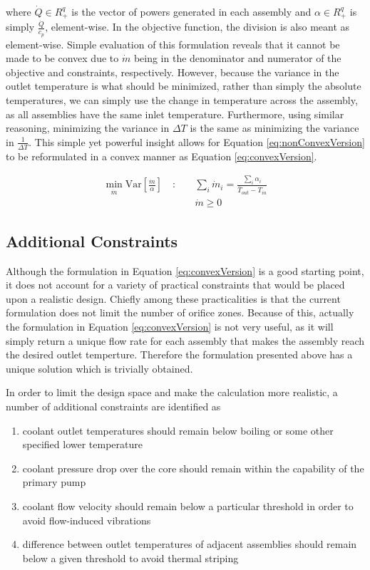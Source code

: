 \documentclass[11pt, oneside]{article}   	%
\newcommand{\Var}{\mathrm{Var}}
\begin{document}
where $\dot{Q} \in R^q_+$ is the vector of powers generated in each assembly and $\alpha \in R^q_+$ is simply $\frac{\dot{Q}}{c_p}$, element-wise.
In the objective function, the division is also meant as element-wise.
Simple evaluation of this formulation reveals that it cannot be made to be convex due to $\dot{m}$ being in the denominator and numerator of the objective and constraints, respectively.
However, because the variance in the outlet temperature is what should be minimized, rather than simply the absolute temperatures, we can simply use the change in temperature across the assembly, as all assemblies have the same inlet temperature.
Furthermore, using similar reasoning, minimizing the variance in $\Delta T$ is the same as minimizing the variance in $\frac{1}{\Delta T}$.
This simple yet powerful insight allows for Equation \ref{eq:nonConvexVersion} to be reformulated in a convex manner as Equation \ref{eq:convexVersion}.

\begin{align}
\min_{\dot{m}} \Var [\frac{\dot{m}}{\alpha}] \quad : \quad & \sum_i \dot{m}_i = \frac{\sum_i \alpha_i}{\bar{T}_{out}-T_{in}} \label{eq:convexVersion} \\
& \dot{m} \geq 0 \nonumber
\end{align}

\subsection{Additional Constraints}

Although the formulation in Equation \ref{eq:convexVersion} is a good starting point, it does not account for a variety of practical constraints that would be placed upon a realistic design.
Chiefly among these practicalities is that the current formulation does not limit the number of orifice zones.
Because of this, actually the formulation in Equation \ref{eq:convexVersion} is not very useful, as it will simply return a unique flow rate for each assembly that makes the assembly reach the desired outlet temperture.
Therefore the formulation presented above has a unique solution which is trivially obtained. 

In order to limit the design space and make the calculation more realistic, a number of additional constraints are identified as

\begin{enumerate}
\item \label{list:maxTemp}coolant outlet temperatures should remain below boiling or some other specified lower temperature 
\item \label{list:dP} coolant pressure drop over the core should remain within the capability of the primary pump
\item \label{list:v_max} coolant flow velocity should remain below a particular threshold in order to avoid flow-induced vibrations
\item \label{list:adjacent} difference between outlet temperatures of adjacent assemblies should remain below a given threshold to avoid thermal striping
\end{enumerate}
\end{document}
